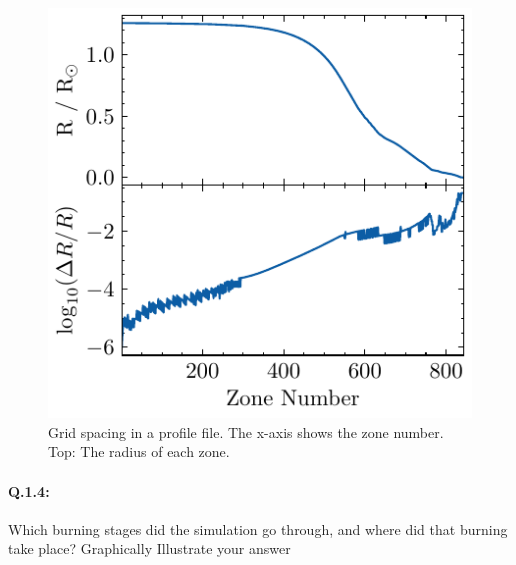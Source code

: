\documentclass[twocolumn,fontsize=11pt]{scrartcl}
\begin{document}
\begin{figure}[htbp]
    \centering
    \includegraphics{R_vs_zone.pdf}
    \caption{Grid spacing in a profile file. The x-axis shows the zone number. Top: The radius of each zone.}
    \label{fig:grid_spacing}
\end{figure}


\paragraph{Q.1.4:} Which burning stages did the simulation go through, and where did that burning take
place? Graphically Illustrate your answer

\printbibliography
\end{document}
